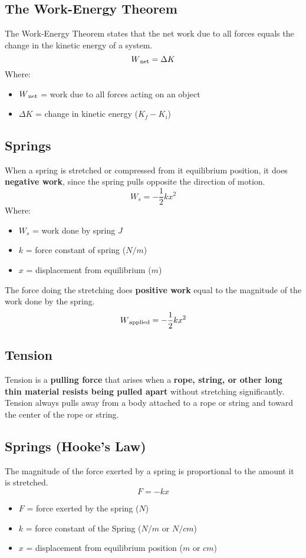 \subsection{The Work-Energy Theorem}
The Work-Energy Theorem states that the net work due to all forces equals the change in the kinetic energy of a system. \[W\textsubscript{net}=\Delta K\] Where:
\begin{itemize}
	\item $W\textsubscript{net}$ = work due to all forces acting on an object
	\item $\Delta K$ = change in kinetic energy ($K_f-K_i$)
\end{itemize}

\subsection{Springs}
When a spring is stretched or compressed from it equilibrium position, it does \textbf{negative work}, since the spring pulls opposite the direction of motion. \[W_s=-\frac{1}{2}kx^2\] Where:
\begin{itemize}
	\item $W_s$ = work done by spring $J$
	\item $k$ = force constant of spring ($N/m$)
	\item $x$ = displacement from equilibrium ($m$)
\end{itemize}
The force doing the stretching does \textbf{positive work} equal to the magnitude of the work done by the spring. \[W\textsubscript{applied}=-\frac{1}{2}kx^2\]

\subsection{Tension}
Tension is a \textbf{pulling force} that arises when a \textbf{rope, string, or other long thin material resists being pulled apart} without stretching significantly. Tension always pulls away from a body attached to a rope or string and toward the center of the rope or string. 
	
\subsection{Springs (Hooke's Law)}
The magnitude of the force exerted by a spring is proportional to the amount it is stretched. \[F=-kx\] 
\begin{itemize}
	\item $F$ = force exerted by the spring ($N$)
	\item $k$ = force constant of the Spring ($N/m$ or $N/cm$)
	\item $x$ = displacement from equilibrium position ($m$ or $cm$)
\end{itemize}

